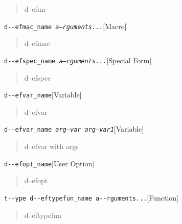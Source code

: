 \documentclass{book}
\begin{document}
%
\begin{quote}
\unskip{\parskip=0pt\noindent}%
d--efun
\end{quote}

\noindent\texttt{d{-}{-}efmac\_name \EmbracOn{}\textnormal{\textsl{a--rguments...}}\EmbracOff{}}\hfill[Macro]



%
\begin{quote}
\unskip{\parskip=0pt\noindent}%
d--efmac
\end{quote}

\noindent\texttt{d{-}{-}efspec\_name \EmbracOn{}\textnormal{\textsl{a--rguments...}}\EmbracOff{}}\hfill[Special Form]



%
\begin{quote}
\unskip{\parskip=0pt\noindent}%
d--efspec
\end{quote}

\noindent\texttt{d{-}{-}efvar\_name}\hfill[Variable]



%
\begin{quote}
\unskip{\parskip=0pt\noindent}%
d--efvar
\end{quote}

\noindent\texttt{d{-}{-}efvar\_name \EmbracOn{}\textnormal{\textsl{arg--var arg--var1}}\EmbracOff{}}\hfill[Variable]



%
\begin{quote}
\unskip{\parskip=0pt\noindent}%
d--efvar with args
\end{quote}

\noindent\texttt{d{-}{-}efopt\_name}\hfill[User Option]



%
\begin{quote}
\unskip{\parskip=0pt\noindent}%
d--efopt
\end{quote}

\noindent\texttt{t{-}{-}ype d{-}{-}eftypefun\_name a{-}{-}rguments...}\hfill[Function]



%
\begin{quote}
\unskip{\parskip=0pt\noindent}%
d--eftypefun
\end{quote}
\end{document}
